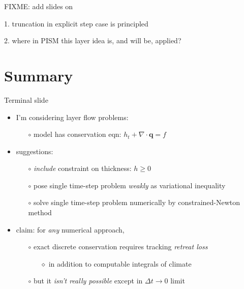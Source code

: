 \documentclass{beamer}
\newcommand\bq{\mathbf{q}}
\newcommand{\Div}{\nabla\cdot}
\begin{document}
\begin{frame}{FIXME: add slides on}

1. truncation in explicit step case is principled

2. where in PISM this layer idea is, and will be, applied?
\end{frame}


\section*{Summary}

\begin{frame}{Terminal slide}

  \begin{itemize}
  \item I'm considering layer flow problems:
    \begin{itemize}
    \item[$\circ$]  model has conservation eqn: $h_t + \Div\bq = f$
    \end{itemize}
  \item suggestions:
    \begin{itemize}
    \item[$\circ$]  \emph{include} constraint on thickness: $h\ge 0$
    \item[$\circ$]  pose single time-step problem \emph{weakly} as variational inequality
    \item[$\circ$]  solve single time-step problem numerically by constrained-Newton method
    \end{itemize}
  \item claim:  for \emph{any} numerical approach,
    \begin{itemize}
    \item[$\circ$]  exact discrete conservation requires tracking \emph{retreat loss}
      \begin{itemize}
      \item[$\diamond$] in addition to computable integrals of climate
      \end{itemize}
    \item[$\circ$]  but it \emph{isn't really possible} except in $\Delta t\to 0$ limit
    \end{itemize}
  \end{itemize}
\end{frame}
\end{document}
